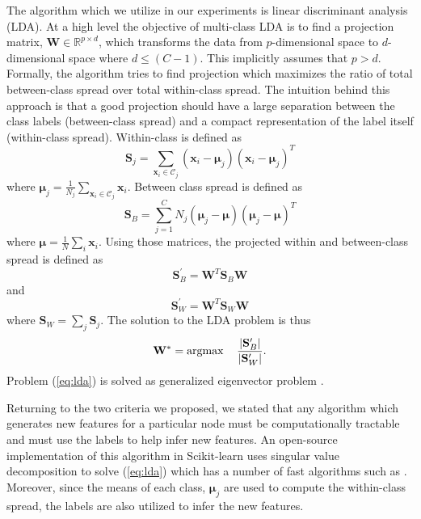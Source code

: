 \documentclass[../thesis.tex]{subfiles}
\begin{document}
The algorithm which we utilize in our experiments is linear discriminant
analysis (LDA). At a high level the objective of multi-class LDA is to find a
projection matrix, $\mathbf{W} \in \mathbb{R}^{p \times d}$, which transforms
the data from $p$-dimensional space to $d$-dimensional space where $d \leq
(C-1)$. This implicitly assumes that $p > d$. Formally, the algorithm tries to
find projection which maximizes the ratio of total between-class spread over
total within-class spread. The intuition behind this approach is that a good
projection should have a large separation between the class labels
(between-class spread) and a compact representation of the label itself
(within-class spread). Within-class is defined as
\begin{equation}
    \mathbf{S}_j = \sum_{\mathbf{x}_i \in \mathcal{C}_j} (\mathbf{x}_i -
    \boldsymbol{\mu}_j)(\mathbf{x}_i - \boldsymbol{\mu}_j)^T
\end{equation}
where $\boldsymbol{\mu}_j = \frac{1}{N_j} \sum_{\mathbf{x}_i \in \mathcal{C}_j}
\mathbf{x}_i$. Between class spread is defined as
\begin{equation}
    \mathbf{S}_B = \sum_{j=1}^C N_j (\boldsymbol{\mu}_j -
    \boldsymbol{\mu})(\boldsymbol{\mu}_j - \boldsymbol{\mu})^T
\end{equation}
where $\boldsymbol{\mu} = \frac{1}{N} \sum_i \mathbf{x}_i$. Using those
matrices, the projected within and between-class spread is defined as
\begin{equation}
    \mathbf{S}_B^\prime = \mathbf{W}^T \mathbf{S}_B \mathbf{W}
\end{equation}
and
\begin{equation}
    \mathbf{S}_W^\prime = \mathbf{W}^T \mathbf{S}_W \mathbf{W}
\end{equation}
where $\mathbf{S}_W = \sum_j \mathbf{S}_j.$ The solution to the LDA problem is thus
\begin{equation}
    \label{eq:lda}
    \mathbf{W}^* = \operatorname*{argmax} \quad \frac{\left| \mathbf{S}_B^\prime \right|}
    {\left| \mathbf{S}_W^\prime \right|}.
\end{equation}
Problem (\ref{eq:lda}) is solved as generalized eigenvector problem
\cite{mika1999fisher}.

Returning to the two criteria we proposed, we stated that any algorithm which
generates new features for a particular node must be computationally tractable
and must use the labels to help infer new features. An open-source
implementation of this algorithm in Scikit-learn uses singular value
decomposition to solve (\ref{eq:lda}) which has a number of fast algorithms such
as \cite{halko2011finding}. Moreover, since the means of each class,
$\boldsymbol{\mu}_j$ are used to compute the within-class spread, the labels are
also utilized to infer the new features.
\end{document}
